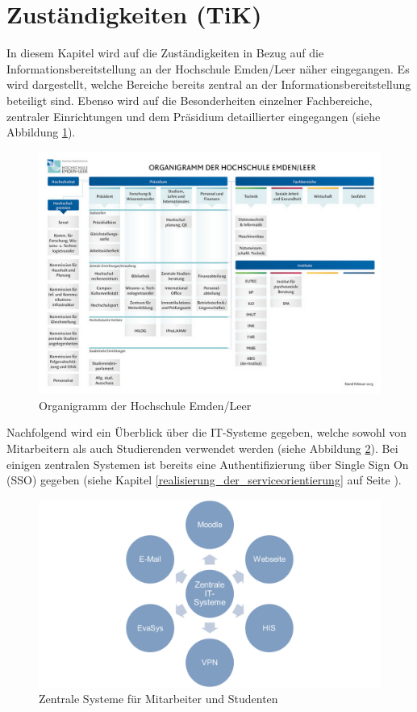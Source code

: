 \section{Zuständigkeiten (TiK)}
\label{section_zustaendigkeiten}
In diesem Kapitel wird auf die Zuständigkeiten in Bezug auf die Informationsbereitstellung an der Hochschule Emden/Leer näher eingegangen. Es wird dargestellt, welche Bereiche bereits zentral an der Informationsbereitstellung beteiligt sind. Ebenso wird auf die Besonderheiten einzelner Fachbereiche, zentraler Einrichtungen und dem Präsidium detaillierter eingegangen (siehe Abbildung \ref{fig_organigramm_HS}). 

\begin{figure}[h!]
	\centering
	\includegraphics[width=14cm]{kapitel/gruppe2/bilder/organigramm_HS}
	\caption{Organigramm der Hochschule Emden/Leer}
	\label{fig_organigramm_HS}
\end{figure}

Nachfolgend wird ein Überblick über die IT-Systeme gegeben, welche sowohl von Mitarbeitern als auch Studierenden verwendet werden (siehe Abbildung  \ref{fig_zentrale_systeme}). Bei einigen zentralen Systemen ist bereits eine Authentifizierung über Single Sign On (SSO) gegeben (siehe Kapitel \ref{realisierung_der_serviceorientierung} auf Seite \pageref{realisierung_der_serviceorientierung}).

\begin{figure}[h!]
	\centering
	\includegraphics[width=14cm]{kapitel/gruppe2/bilder/zentrale_systeme}
	\caption{Zentrale Systeme für Mitarbeiter und Studenten}
	\label{fig_zentrale_systeme}
\end{figure}


